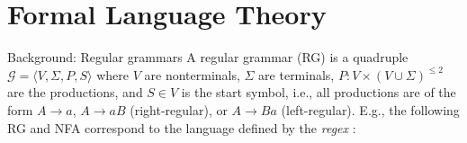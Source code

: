 \documentclass{beamer}
\begin{document}
\section{Formal Language Theory}\label{sec:fltheory}


\begin{frame}[fragile]{Background: Regular grammars}
  A regular grammar (RG) is a quadruple $\mathcal{G} = \langle V, \Sigma, P, S\rangle$ where $V$ are nonterminals, $\Sigma$ are terminals, $P: V\times (V \cup \Sigma)^{\leq 2}$ are the productions, and $S\in V$ is the start symbol, i.e., all productions are of the form $A \rightarrow a$, $A \rightarrow a B$ (right-regular), or $A \rightarrow B a$ (left-regular). E.g., the following RG and NFA correspond to the language defined by the \textit{regex} :


\end{frame}
\end{document}
